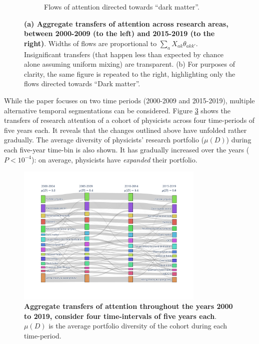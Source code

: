 \documentclass{article}
\begin{document}
\begin{figure}[h]
\begin{subfigure}[t]{0.47\textwidth}
    \caption{\label{fig:sankey_b}Flows of attention directed towards ``dark matter''.}
\end{subfigure}
     \caption{\textbf{(a) Aggregate transfers of attention across research areas, between 2000-2009 (to the left) and 2015-2019 (to the right)}. Widths of flows are proportional to $\sum_a X_{ak}\theta_{akk'}$. Insignificant transfers (that happen less than expected by chance alone assuming uniform mixing) are transparent. (b) For purposes of clarity, the same figure is repeated to the right, highlighting only the flows directed towards ``Dark matter''.}
     \label{fig:sankey}
 \end{figure}

While the paper focuses on two time periods (2000-2009 and 2015-2019), multiple alternative temporal segmentations can be considered. Figure \ref{fig:sankey_five_years} shows the transfers of research attention of a cohort of physicists across four time-periods of five years each. It reveals that the changes outlined above have unfolded rather gradually. The average diversity of physicists' research portfolio ($\mu(D)$) during each five-year time-bin is also shown. It has gradually increased over the years ($P<10^{-4}$): on average, physicists have \textit{expanded} their portfolio.

\begin{figure}[!h]
    \centering
    \includegraphics[width=0.8\textwidth,trim={2.1cm 1.5cm 2.1cm 1.5cm},clip]{Fig5.pdf}
    \caption{\textbf{Aggregate transfers of attention throughout the years 2000 to 2019, consider four time-intervals of five years each}. $\mu(D)$ is the average portfolio diversity of the cohort during each time-period.}
    \label{fig:sankey_five_years}
\end{figure}
\end{document}

